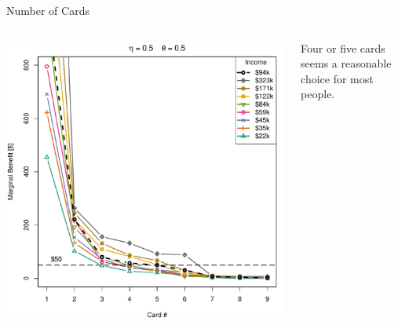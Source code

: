 \begin{frame}{Number of Cards}
    \begin{columns}[c]
        \begin{column}{0.7\textwidth}
            \includegraphics[width=0.9\textheight]{../Figures/MBvsKvsIncome_05_05.pdf}
        \end{column}
        \begin{column}{0.3\textwidth}
            \centering
            Four or five cards seems a reasonable choice for most people.
        \end{column}
    \end{columns}
\end{frame} 

